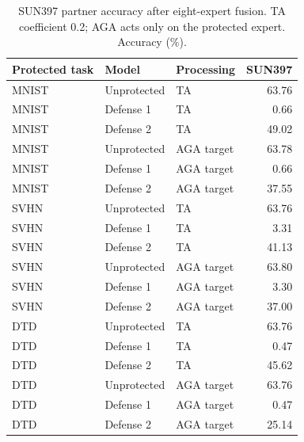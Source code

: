 \begin{table}[t]
\centering\small
\caption{SUN397 partner accuracy after eight-expert fusion. TA coefficient 0.2; AGA acts only on the protected expert. Accuracy (\%).}
\begin{tabular}{lllr}
\toprule
Protected task & Model & Processing & SUN397 \\
\midrule
MNIST & Unprotected & TA & 63.76 \\
MNIST & Defense 1 & TA & 0.66 \\
MNIST & Defense 2 & TA & 49.02 \\
MNIST & Unprotected & AGA target & 63.78 \\
MNIST & Defense 1 & AGA target & 0.66 \\
MNIST & Defense 2 & AGA target & 37.55 \\
SVHN & Unprotected & TA & 63.76 \\
SVHN & Defense 1 & TA & 3.31 \\
SVHN & Defense 2 & TA & 41.13 \\
SVHN & Unprotected & AGA target & 63.80 \\
SVHN & Defense 1 & AGA target & 3.30 \\
SVHN & Defense 2 & AGA target & 37.00 \\
DTD & Unprotected & TA & 63.76 \\
DTD & Defense 1 & TA & 0.47 \\
DTD & Defense 2 & TA & 45.62 \\
DTD & Unprotected & AGA target & 63.76 \\
DTD & Defense 1 & AGA target & 0.47 \\
DTD & Defense 2 & AGA target & 25.14 \\
\bottomrule
\end{tabular}
\end{table}
